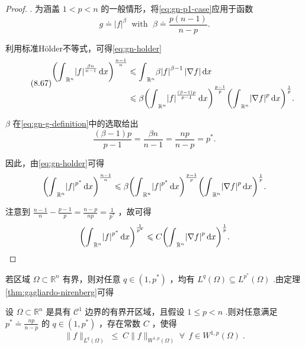 \begin{proof}
. 为涵盖 $1 < p < n$ 的一般情形，将\eqref{eq:gn-p1-case}应用于函数
\begin{equation}\tag{8.66}\label{eq:gn-g-definition}
 g \doteq  {\left| f\right| }^{\beta }\;\text{ with }\;\beta  \doteq  \frac{p\left( {n - 1}\right) }{n - p}.
\end{equation}

利用标准Hölder不等式，可得\eqref{eq:gn-holder}
\begin{equation}\tag{8.67}\label{eq:gn-holder}
\begin{aligned}
{\left( {\int }_{{\mathbb{R}}^{n}}{\left| f\right| }^{\frac{\beta n}{n - 1}}\mathop{}\!\mathrm{d}x\right) }^{\frac{n - 1}{n}}
&\leqslant  {\int }_{{\mathbb{R}}^{n}}\beta {\left| f\right| }^{\beta  - 1}\left| {\nabla f}\right| {\mathop{}\!\mathrm{d} x} \\
&\leqslant  \beta {\left( {\int }_{{\mathbb{R}}^{n}}{\left| f\right| }^{\frac{\left( {\beta  - 1}\right) p}{p - 1}}\mathop{}\!\mathrm{d}x\right) }^{\frac{p - 1}{p}}{\left( {\int }_{{\mathbb{R}}^{n}}{\left| \nabla f\right| }^{p}\mathop{}\!\mathrm{d} x\right) }^{\frac{1}{p}}.
\end{aligned}
\end{equation}

$\beta$ 在\eqref{eq:gn-g-definition}中的选取给出
\[
\frac{\left( {\beta  - 1}\right) p}{p - 1} = \frac{\beta n}{n - 1} = \frac{np}{n - p} = {p}^{ * }.
\]

因此，由\eqref{eq:gn-holder}可得
\[
{\left( {\int }_{{\mathbb{R}}^{n}}{\left| f\right| }^{{p}^{ * }}\mathop{}\!\mathrm{d} x\right) }^{\frac{n - 1}{n}} \leqslant  \beta {\left( {\int }_{{\mathbb{R}}^{n}}{\left| f\right| }^{{p}^{ * }}\mathop{}\!\mathrm{d}x\right) }^{\frac{p - 1}{p}}{\left( {\int }_{{\mathbb{R}}^{n}}{\left| \nabla f\right| }^{p}\mathop{}\!\mathrm{d} x\right) }^{\frac{1}{p}}.
\]

注意到 $\frac{n - 1}{n} - \frac{p - 1}{p} = \frac{n - p}{np} = \frac{1}{{p}^{ * }}$ ，故可得
\[
{\left( {\int }_{{\mathbb{R}}^{n}}{\left| f\right| }^{{p}^{ * }}\mathop{}\!\mathrm{d} x\right) }^{\frac{1}{{p}^{ * }}} \leqslant  C{\left( {\int }_{{\mathbb{R}}^{n}}{\left| \nabla f\right| }^{p}\mathop{}\!\mathrm{d} x\right) }^{\frac{1}{p}}.
\]
\end{proof}

若区域 $\Omega  \subset  {\mathbb{R}}^{n}$ 有界，则对任意 $q \in  \left(  {1,{p}^{ * }}\right)$ ，均有 ${L}^{q}\left( \Omega \right)  \subseteq  {L}^{{p}^{ * }}\left( \Omega \right)$ .由定理\ref{thm:gagliardo-nirenberg}可得

\begin{corollary}[嵌入]\label{cor:gn-embedding}
设 $\Omega  \subset  {\mathbb{R}}^{n}$ 是具有 ${\mathcal{C}}^{1}$ 边界的有界开区域，且假设 $1 \leq  p < n$ .则对任意满足 ${p}^{ * } \doteq  \frac{np}{n - p}$ 的 $q \in  \left(  {1,{p}^{ * }}\right)$ ，存在常数 $C$ ，使得
\begin{equation}\tag{8.68}\label{eq:gn-embedding}
\| f{\| }_{{L}^{q}\left( \Omega \right) }\; \leq  \;C\| f{\| }_{{W}^{1,p}\left( \Omega \right) }\;\forall\,\;f \in  {W}^{1,p}\left( \Omega \right) \;.
\end{equation}
\end{corollary}

